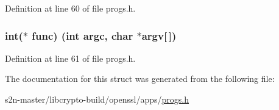 Definition at line 60 of file progs.\+h.

\subsubsection[{\texorpdfstring{func}{func}}]{\setlength{\rightskip}{0pt plus 5cm}int($\ast$ func) (int argc, char $\ast$argv\mbox{[}$\,$\mbox{]})}\hypertarget{struct_f_u_n_c_t_i_o_n_a2093e5f7c7c03ae9d346f4e8e3c41d75}{}\label{struct_f_u_n_c_t_i_o_n_a2093e5f7c7c03ae9d346f4e8e3c41d75}


Definition at line 61 of file progs.\+h.



The documentation for this struct was generated from the following file\+:\begin{DoxyCompactItemize}
\item 
s2n-\/master/libcrypto-\/build/openssl/apps/\hyperlink{progs_8h}{progs.\+h}\end{DoxyCompactItemize}

